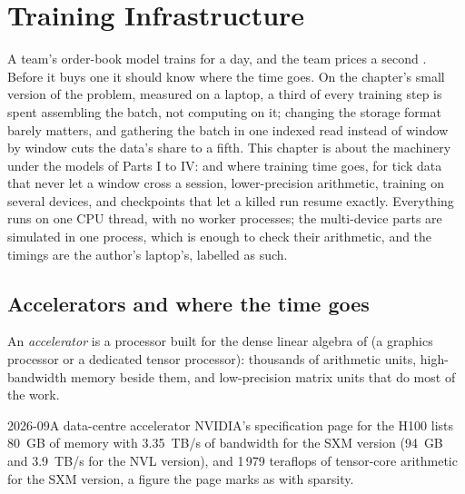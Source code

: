 \chapter{Training Infrastructure}\label{ch:ml:training-infrastructure}

A team's order-book model trains for a day, and the team prices a second . Before it buys one it should know
where the time goes. On the chapter's small version of the problem, measured on a laptop, a third of every training step is
spent assembling the batch, not computing on it; changing the storage format barely matters, and gathering the batch in one
indexed read instead of window by window cuts the data's share to a fifth. This chapter is about the machinery under the
models of Parts I to IV:  and where training time goes,  for tick data that never let a window cross
a session, lower-precision arithmetic, training on several devices, and checkpoints that let a killed run resume exactly.
Everything runs on one CPU thread, with no worker processes; the multi-device parts are simulated in one process, which is
enough to check their arithmetic, and the timings are the author's laptop's, labelled as such.

\section{Accelerators and where the time goes}

\begin{definition}[Accelerator]\label{def:ml:training-infrastructure:accelerator}
An \emph{accelerator} is a processor built for the dense linear algebra of  (a graphics
processor or a dedicated tensor processor): thousands of arithmetic units, high-bandwidth memory beside them, and
low-precision matrix units that do most of the work.
\end{definition}

\begin{dated}{2026-09}{A data-centre accelerator}\label{dat:ml:training-infrastructure:h100}
NVIDIA's specification page for the H100 lists 80~GB of memory with 3.35~TB/s of bandwidth for the SXM version (94~GB and
3.9~TB/s for the NVL version), and 1\,979 teraflops of  tensor-core arithmetic for the SXM version, a figure the page
marks as with sparsity.
\end{dated}

